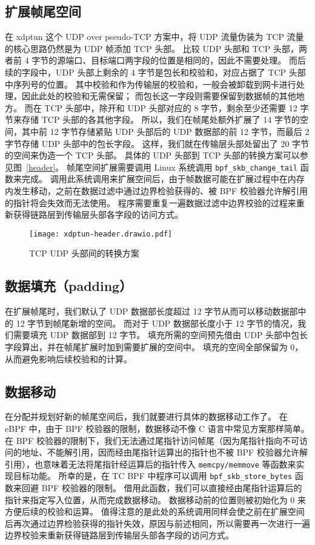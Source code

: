 \subsection{扩展帧尾空间}

在 xdptun 这个 UDP over pseudo-TCP 方案中，将 UDP 流量伪装为 TCP 流量的核心思路仍然是为 UDP 帧添加 TCP 头部。
比较 UDP 头部和 TCP 头部，两者前 4 字节的源端口、目标端口两字段的位置是相同的，因此不需要处理。
而后续的字段中，UDP 头部上剩余的 4 字节是包长和校验和，对应占据了 TCP 头部中序列号的位置。
其中校验和作为传输层的校验和，一般会被卸载到网卡进行处理，因此此处的校验和无需保留；
而包长这一字段则需要保留到数据帧的其他地方。
而在 TCP 头部中，除开和 UDP 头部对应的 8 字节，剩余至少还需要 12 字节来存储 TCP 头部的各其他字段。
所以，我们在帧尾处额外扩展了 14 字节的空间，其中前 12 字节存储紧贴 UDP 头部后的 UDP 数据部的前 12 字节，而最后 2 字节存储 UDP 头部中的包长字段。
这样，我们就在传输层头部处留出了 20 字节的空间来伪造一个 TCP 头部。
具体的 UDP 头部到 TCP 头部的转换方案可以参见图~\ref{header}。
帧尾空间扩展需要调用 Linux 系统调用 \texttt{bpf\_skb\_change\_tail} 函数来完成。
调用此系统调用来扩展空间后，由于帧数据可能在扩展过程中在内存内发生移动，之前在数据过滤中通过边界检验获得的、被 BPF 校验器允许解引用的指针将会失效而无法使用。
程序需要重复一遍数据过滤中边界校验的过程来重新获得链路层到传输层头部各字段的访问方式。

\begin{figure}[h]
  \centering
  \texttt{[image: xdptun-header.drawio.pdf]}
  \caption{TCP UDP 头部间的转换方案}
  \label{fig:header}
\end{figure}

\subsection{数据填充（padding）}

在扩展帧尾时，我们默认了 UDP 数据部长度超过 12 字节从而可以移动数据部中的 12 字节到帧尾新增的空间。
而对于 UDP 数据部长度小于 12 字节的情况，我们需要填充 UDP 数据部到 12 字节。
填充所需的空间预先借由 UDP 头部中包长字段算出，并在帧尾扩展时加到需要扩展的空间中。
填充的空间全部保留为 0，从而避免影响后续校验和的计算。

\subsection{数据移动}

在分配并规划好新的帧尾空间后，我们就要进行具体的数据移动工作了。
在 eBPF 中，由于 BPF 校验器的限制，数据移动不像 C 语言中常见方案那样简单。
在 BPF 校验器的限制下，我们无法通过尾指针访问帧尾（因为尾指针指向不可访问的地址、不能解引用，因而经由尾指针运算出的指针也不被 BPF 校验器允许解引用），也意味着无法将尾指针经运算后的指针传入 \texttt{memcpy/memmove} 等函数来实现目标功能。
所幸的是，在 TC BPF 中程序可以调用 \texttt{bpf\_skb\_store\_bytes} 函数来回避 BPF 校验器的限制。
借用此函数，我们可以直接经由尾指针运算后的指针来指定写入位置，从而完成数据移动。
数据移动前的位置则被初始化为 0 来方便后续的校验和运算。
值得注意的是此处的系统调用同样会使之前在扩展空间后再次通过边界检验获得的指针失效，原因与前述相同，所以需要再一次进行一遍边界校验来重新获得链路层到传输层头部各字段的访问方式。

